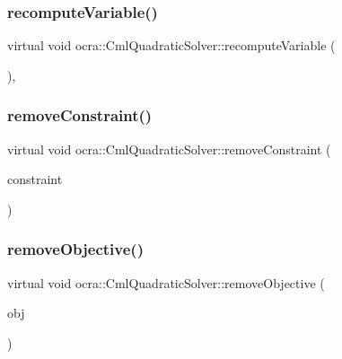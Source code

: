 \subsubsection{\texorpdfstring{recompute\+Variable()}{recomputeVariable()}}
{\footnotesize\ttfamily virtual void ocra\+::\+Cml\+Quadratic\+Solver\+::recompute\+Variable (\begin{DoxyParamCaption}\item[{void}]{ }\end{DoxyParamCaption})\hspace{0.3cm}{\ttfamily [protected]}, {\ttfamily [virtual]}}

\hypertarget{classocra_1_1CmlQuadraticSolver_a570e7be65f21d67e41a0f030d5134e4e}{}\label{classocra_1_1CmlQuadraticSolver_a570e7be65f21d67e41a0f030d5134e4e} 
\subsubsection{\texorpdfstring{remove\+Constraint()}{removeConstraint()}}
{\footnotesize\ttfamily virtual void ocra\+::\+Cml\+Quadratic\+Solver\+::remove\+Constraint (\begin{DoxyParamCaption}\item[{\hyperlink{namespaceocra_ae8b87cf4099be3efc3b410019ad2046e}{Linear\+Constraint} $\ast$}]{constraint }\end{DoxyParamCaption})\hspace{0.3cm}{\ttfamily [virtual]}}

\hypertarget{classocra_1_1CmlQuadraticSolver_a83d20013d6a9ff7c5855ee0ff2391190}{}\label{classocra_1_1CmlQuadraticSolver_a83d20013d6a9ff7c5855ee0ff2391190} 
\subsubsection{\texorpdfstring{remove\+Objective()}{removeObjective()}}
{\footnotesize\ttfamily virtual void ocra\+::\+Cml\+Quadratic\+Solver\+::remove\+Objective (\begin{DoxyParamCaption}\item[{\hyperlink{classocra_1_1QuadraticFunction}{Quadratic\+Function} $\ast$}]{obj }\end{DoxyParamCaption})\hspace{0.3cm}{\ttfamily [virtual]}}


